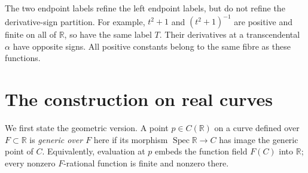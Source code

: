 \documentclass[11pt]{article}
\theoremstyle{remark}
\newcommand{\R}{\mathbb R}
\begin{document}
The two endpoint labels refine the left endpoint labels, but do not refine the derivative-sign partition. For example, $t^2+1$ and $(t^2+1)^{-1}$ are positive and finite on all of $\R$, so have the same label $T$. Their derivatives at a transcendental $\alpha$ have opposite signs. All positive constants belong to the same fibre as these functions.

\section{The construction on real curves}
We first state the geometric version. A point $p\in C(\R)$ on a curve defined over $F\subset\R$ is \emph{generic over $F$} here if its morphism $\operatorname{Spec}\R\to C$ has image the generic point of $C$. Equivalently, evaluation at $p$ embeds the function field $F(C)$ into $\R$; every nonzero $F$-rational function is finite and nonzero there.
\end{document}
